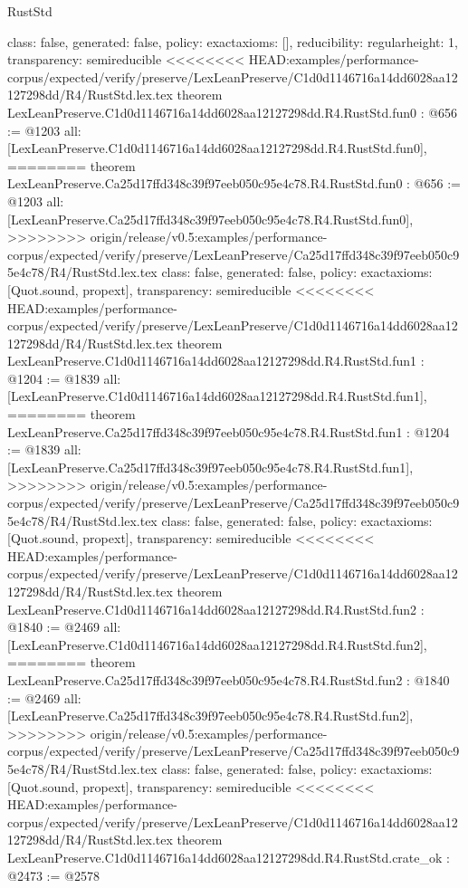 \begin{lexlean}{RustStd}
\begin{coremodule}
{\begin{coremodule}
{{{  class: false,
  generated: false,
  policy: exact{axioms: []},
  reducibility: regular{height: 1},
  transparency: semireducible
}
<<<<<<<< HEAD:examples/performance-corpus/expected/verify/preserve/LexLeanPreserve/C1d0d1146716a14dd6028aa12127298dd/R4/RustStd.lex.tex
theorem LexLeanPreserve.C1d0d1146716a14dd6028aa12127298dd.R4.RustStd.fun0 : @656 := @1203 {
  all: [LexLeanPreserve.C1d0d1146716a14dd6028aa12127298dd.R4.RustStd.fun0],
========
theorem LexLeanPreserve.Ca25d17ffd348c39f97eeb050c95e4c78.R4.RustStd.fun0 : @656 := @1203 {
  all: [LexLeanPreserve.Ca25d17ffd348c39f97eeb050c95e4c78.R4.RustStd.fun0],
>>>>>>>> origin/release/v0.5:examples/performance-corpus/expected/verify/preserve/LexLeanPreserve/Ca25d17ffd348c39f97eeb050c95e4c78/R4/RustStd.lex.tex
  class: false,
  generated: false,
  policy: exact{axioms: [Quot.sound, propext]},
  transparency: semireducible
}
<<<<<<<< HEAD:examples/performance-corpus/expected/verify/preserve/LexLeanPreserve/C1d0d1146716a14dd6028aa12127298dd/R4/RustStd.lex.tex
theorem LexLeanPreserve.C1d0d1146716a14dd6028aa12127298dd.R4.RustStd.fun1 : @1204 := @1839 {
  all: [LexLeanPreserve.C1d0d1146716a14dd6028aa12127298dd.R4.RustStd.fun1],
========
theorem LexLeanPreserve.Ca25d17ffd348c39f97eeb050c95e4c78.R4.RustStd.fun1 : @1204 := @1839 {
  all: [LexLeanPreserve.Ca25d17ffd348c39f97eeb050c95e4c78.R4.RustStd.fun1],
>>>>>>>> origin/release/v0.5:examples/performance-corpus/expected/verify/preserve/LexLeanPreserve/Ca25d17ffd348c39f97eeb050c95e4c78/R4/RustStd.lex.tex
  class: false,
  generated: false,
  policy: exact{axioms: [Quot.sound, propext]},
  transparency: semireducible
}
<<<<<<<< HEAD:examples/performance-corpus/expected/verify/preserve/LexLeanPreserve/C1d0d1146716a14dd6028aa12127298dd/R4/RustStd.lex.tex
theorem LexLeanPreserve.C1d0d1146716a14dd6028aa12127298dd.R4.RustStd.fun2 : @1840 := @2469 {
  all: [LexLeanPreserve.C1d0d1146716a14dd6028aa12127298dd.R4.RustStd.fun2],
========
theorem LexLeanPreserve.Ca25d17ffd348c39f97eeb050c95e4c78.R4.RustStd.fun2 : @1840 := @2469 {
  all: [LexLeanPreserve.Ca25d17ffd348c39f97eeb050c95e4c78.R4.RustStd.fun2],
>>>>>>>> origin/release/v0.5:examples/performance-corpus/expected/verify/preserve/LexLeanPreserve/Ca25d17ffd348c39f97eeb050c95e4c78/R4/RustStd.lex.tex
  class: false,
  generated: false,
  policy: exact{axioms: [Quot.sound, propext]},
  transparency: semireducible
}
<<<<<<<< HEAD:examples/performance-corpus/expected/verify/preserve/LexLeanPreserve/C1d0d1146716a14dd6028aa12127298dd/R4/RustStd.lex.tex
theorem LexLeanPreserve.C1d0d1146716a14dd6028aa12127298dd.R4.RustStd.crate_ok : @2473 := @2578 {
}}}}}}
\end{coremodule}}
\end{coremodule}
\end{lexlean}
